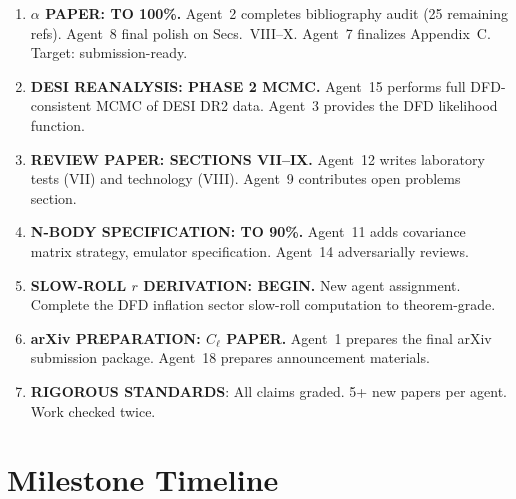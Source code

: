 \documentclass[11pt,a4paper]{article}
\begin{document}
\begin{enumerate}
\item \textbf{$\alpha$ PAPER: TO 100\%.} Agent~2 completes bibliography audit (25 remaining refs). Agent~8 final polish on Secs.\ VIII--X. Agent~7 finalizes Appendix~C. Target: submission-ready.

\item \textbf{DESI REANALYSIS: PHASE 2 MCMC.} Agent~15 performs full DFD-consistent MCMC of DESI DR2 data. Agent~3 provides the DFD likelihood function.

\item \textbf{REVIEW PAPER: SECTIONS VII--IX.} Agent~12 writes laboratory tests (VII) and technology (VIII). Agent~9 contributes open problems section.

\item \textbf{N-BODY SPECIFICATION: TO 90\%.} Agent~11 adds covariance matrix strategy, emulator specification. Agent~14 adversarially reviews.

\item \textbf{SLOW-ROLL $r$ DERIVATION: BEGIN.} New agent assignment. Complete the DFD inflation sector slow-roll computation to theorem-grade.

\item \textbf{arXiv PREPARATION: $C_\ell$ PAPER.} Agent~1 prepares the final arXiv submission package. Agent~18 prepares announcement materials.

\item \textbf{RIGOROUS STANDARDS}: All claims graded. 5+ new papers per agent. Work checked twice.
\end{enumerate}


\section{Milestone Timeline}
\label{sec:timeline}
\end{document}
